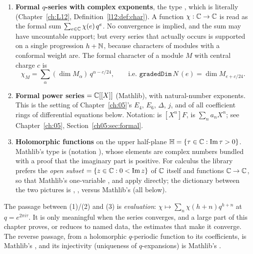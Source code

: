 \begin{enumerate}
\item \textbf{Formal $q$-series with complex exponents}, the type , which is literally 
  (Chapter~\ref{ch:L12}, Definition~\ref{l12:def:char}). A function $\chi:{\mathbb{C}}\to{\mathbb{C}}$ is read as the formal sum
  $\sum_{e\in{\mathbb{C}}}\chi(e)\,q^e$. No convergence is implied, and the sum may have uncountable support; but every series that
  actually occurs is supported on a single progression $h+{\mathbb{N}}$, because characters of modules with a conformal weight
  are. The formal character of a module $M$ with central charge $c$ is
  \begin{equation*}
    \chi_M = \sum_{\alpha}(\dim M_\alpha)\,q^{\alpha - c/24},\qquad \text{i.e. } \mathtt{gradedDim}\,N\,(e) = \dim M_{e+c/24}.
  \end{equation*}
\item \textbf{Formal power series}  $={\mathbb{C}}[[X]]$ (Mathlib), with natural-number exponents. This is the
  setting of Chapter~\ref{ch:05}'s $E_4$, $E_6$, $\Delta$, $j$, and of all coefficient rings of differential equations below.
  Notation:  is $[X^n]F$,  is $\sum_na_nX^n$; see Chapter~\ref{ch:05},
  Section~\ref{ch05:sec:formal}.
\item \textbf{Holomorphic functions} on the upper half-plane $\mathbb{H} = \{\tau\in{\mathbb{C}}:\operatorname{Im}\tau>0\}$. Mathlib's type is
   (notation ), whose elements are complex numbers bundled with a proof that the imaginary part
  is positive. For calculus the library prefers the \emph{open subset}  $=\{z\in{\mathbb{C}} : 0<\operatorname{Im} z\}$ of ${\mathbb{C}}$
  itself and functions ${\mathbb{C}}\to{\mathbb{C}}$, so that Mathlib's one-variable ,  and
   apply directly; the dictionary between the two pictures is ,
  ,  versus Mathlib's  (all below).
\end{enumerate}
The passage between (1)/(2) and (3) is \emph{evaluation}: $\chi\mapsto\sum_n\chi(h+n)q^{h+n}$ at $q = e^{2\pi i\tau}$. It is
only meaningful when the series converges, and a large part of this chapter proves, or reduces to named data, the
estimates that make it converge. The reverse passage, from a holomorphic $q$-periodic function to its coefficients, is
Mathlib's , and its injectivity (uniqueness of $q$-expansions) is Mathlib's
.

